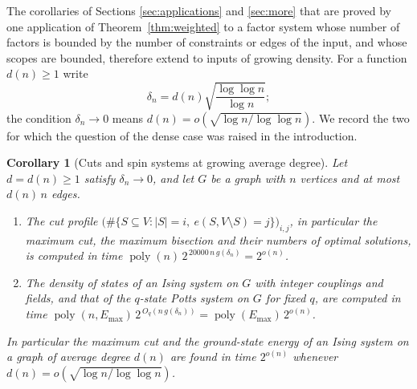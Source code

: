 \documentclass[11pt,reqno]{amsart}
\numberwithin{equation}{section}
\theoremstyle{plain}
\newtheorem{corollary}[theorem]{Corollary}
\theoremstyle{definition}
\theoremstyle{remark}
\DeclareMathOperator{\poly}{poly}
\begin{document}
The corollaries of Sections \ref{sec:applications} and \ref{sec:more} that are
proved by one application of Theorem~\ref{thm:weighted} to a factor system whose
number of factors is bounded by the number of constraints or edges of the input,
and whose scopes are bounded, therefore extend to inputs of growing density. For a
function $d(n)\ge1$ write
\[
  \delta_n=d(n)\sqrt{\frac{\log\log n}{\log n}} ;
\]
the condition $\delta_n\to0$ means $d(n)=o(\sqrt{\log n/\log\log n})$. We record the
two for which the question of the dense case was raised in the introduction.

\begin{corollary}[Cuts and spin systems at growing average degree]\label{cor:density}
Let $d=d(n)\ge1$ satisfy $\delta_n\to0$, and let $G$ be a graph with $n$ vertices and
at most $d(n)\,n$ edges.
\begin{enumerate}[label=(\roman*),leftmargin=2.2em]
\item\label{it:densecut} The cut profile $\bigl(\#\{S\subseteq V:|S|=i,\
e(S,V\setminus S)=j\}\bigr)_{i,j}$, in particular the maximum cut, the maximum
bisection and their numbers of optimal solutions, is computed in time
$\poly(n)\,2^{\,20000\,n\,g(\delta_n)}=2^{o(n)}$.
\item\label{it:denseising} The density of states of an Ising system on $G$
with integer couplings and fields, and that of the $q$-state Potts system on
$G$ for fixed $q$, are computed in time
$\poly(n,E_{\max})\,2^{\,O_q(n\,g(\delta_n))}=\poly(E_{\max})\,2^{o(n)}$.
\end{enumerate}
In particular the maximum cut and the ground-state energy of an Ising system on
a graph of average degree $d(n)$ are found in time $2^{o(n)}$ whenever
$d(n)=o(\sqrt{\log n/\log\log n})$.
\end{corollary}
\end{document}
